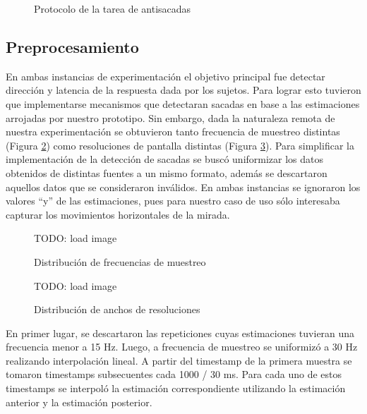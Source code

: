 \begin{figure}
    \centering
    \caption{Protocolo de la tarea de antisacadas}
    \label{fig:antisaccades-protocol}
\end{figure}

\subsection{Preprocesamiento} \label{section:preprocessing}

En ambas instancias de experimentación el objetivo principal fue detectar
dirección y latencia de la respuesta dada por los sujetos.
Para lograr esto tuvieron que implementarse mecanismos que detectaran sacadas
en base a las estimaciones arrojadas por nuestro prototipo.
Sin embargo, dada la naturaleza remota de nuestra experimentación se obtuvieron
tanto frecuencia de muestreo distintas (Figura
\ref{fig:sampling-frequency-distribution}) como resoluciones de pantalla
distintas (Figura \ref{fig:widths-distribution}).
Para simplificar la implementación de la detección de sacadas se buscó
uniformizar los datos obtenidos de distintas fuentes a un mismo formato, además
se descartaron aquellos datos que se consideraron inválidos.
En ambas instancias se ignoraron los valores “y” de las estimaciones, pues para
nuestro caso de uso sólo interesaba capturar los movimientos horizontales de la
mirada.

\begin{figure}
  \centering
  TODO: load image
  \caption{Distribución de frecuencias de muestreo}
  \label{fig:sampling-frequency-distribution}
\end{figure}

\begin{figure}
  \centering
  TODO: load image
  \caption{Distribución de anchos de resoluciones}
  \label{fig:widths-distribution}
\end{figure}

En primer lugar, se descartaron las repeticiones cuyas estimaciones tuvieran
una frecuencia menor a 15 Hz.
Luego, a frecuencia de muestreo se uniformizó a 30 Hz realizando interpolación
lineal.
A partir del timestamp de la primera muestra se tomaron timestamps subsecuentes
cada 1000 / 30 ms.
Para cada uno de estos timestamps se interpoló la estimación correspondiente
utilizando la estimación anterior y la estimación posterior. 

